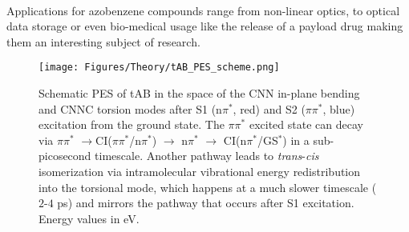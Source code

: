 \\
%
%
%
Applications for azobenzene compounds range from non-linear optics\cite{AB_nonlinear, AB_nonlinear2}, to optical data storage \cite{AB_memory1} or even bio-medical usage like the release of a payload drug\cite{AB_payload1, AB_payload2} making them an interesting subject of research.
%
%
%
%
%
%
\begin{figure}[h]
\centering
\texttt{[image: Figures/Theory/tAB\_PES\_scheme.png]}
\caption{Schematic PES of tAB in the space of the CNN in-plane bending and CNNC torsion modes after S1 (n$\pi^*$, red) and S2 ($\pi\pi^*$, blue) excitation from the ground state. The $\pi\pi^*$ excited state can decay via $\pi\pi^*$ $\rightarrow \mathrm{CI}$($\pi\pi^*$/n$\pi^*$) $\rightarrow$ n$\pi^*$ $\rightarrow$ $\mathrm{CI}$(n$\pi^*$/GS$^*$) in a sub-picosecond timescale. Another pathway leads to \textit{trans}-\textit{cis} isomerization via intramolecular vibrational energy redistribution into the torsional mode, which happens at a much slower timescale ($2$-$4$ ps) and mirrors the pathway that occurs after S1 excitation. Energy values in eV.\cite{AB_8}}
\label{fig:tAB_PES}
\end{figure}
%
%
